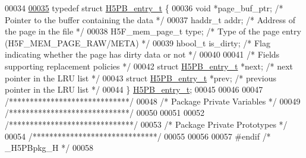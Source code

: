 \begin{DoxyCode}
00034 
\hyperlink{struct_h5_p_b__entry__t}{00035} \textcolor{keyword}{typedef} \textcolor{keyword}{struct }\hyperlink{struct_h5_p_b__entry__t}{H5PB\_entry\_t} \{
00036     \textcolor{keywordtype}{void}            *page\_buf\_ptr;      \textcolor{comment}{/* Pointer to the buffer containing the data */}
00037     haddr\_t     addr;               \textcolor{comment}{/* Address of the page in the file */}
00038     H5F\_mem\_page\_t  type;               \textcolor{comment}{/* Type of the page entry (H5F\_MEM\_PAGE\_RAW/META) */}
00039     hbool\_t         is\_dirty;           \textcolor{comment}{/* Flag indicating whether the page has dirty data or not */}
00040 
00041     \textcolor{comment}{/* Fields supporting replacement policies */}
00042     \textcolor{keyword}{struct }\hyperlink{struct_h5_p_b__entry__t}{H5PB\_entry\_t}     *next;      \textcolor{comment}{/* next pointer in the LRU list */}
00043     \textcolor{keyword}{struct }\hyperlink{struct_h5_p_b__entry__t}{H5PB\_entry\_t}     *prev;      \textcolor{comment}{/* previous pointer in the LRU list */}
00044 \} \hyperlink{struct_h5_p_b__entry__t}{H5PB\_entry\_t};
00045 
00046 
00047 \textcolor{comment}{/*****************************/}
00048 \textcolor{comment}{/* Package Private Variables */}
00049 \textcolor{comment}{/*****************************/}
00050 
00051 
00052 \textcolor{comment}{/******************************/}
00053 \textcolor{comment}{/* Package Private Prototypes */}
00054 \textcolor{comment}{/******************************/}
00055 
00056 
00057 \textcolor{preprocessor}{#endif }\textcolor{comment}{/* \_H5PBpkg\_H */}\textcolor{preprocessor}{}
00058 
\end{DoxyCode}
